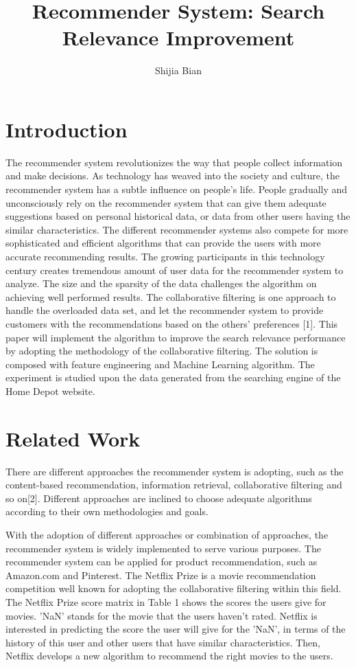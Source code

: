 \documentclass[11pt, titlepage]{article}
\author{Shijia Bian}
\title{Recommender System: Search Relevance Improvement}
\date{\parbox{\linewidth}{}}
\begin{document}
\maketitle
\setcounter{tocdepth}{1}
\section{Introduction}


The recommender system revolutionizes the way that people collect information and make decisions. As technology has weaved into the society and culture, the recommender system has a subtle influence on people's life. People gradually and unconsciously rely on the recommender system that can give them adequate suggestions based on personal historical data, or data from other users having the similar characteristics. The different recommender systems also compete for more sophisticated and efficient algorithms that can provide the users with more accurate recommending results. The growing participants in this technology century creates tremendous amount of user data for the recommender system to analyze. The size and the sparsity of the data challenges the algorithm on achieving well performed results. The collaborative filtering is one approach to handle the overloaded data set, and let the recommender system to provide customers with the recommendations based on the others' preferences [1]. This paper will implement the algorithm to improve the search relevance performance by adopting the methodology of the collaborative filtering. The solution is composed with feature engineering and Machine Learning algorithm. The experiment is studied upon the data generated from the searching engine of the Home Depot website.

\section{Related Work}



There are different approaches the recommender system is adopting, such as the content-based recommendation, information retrieval, collaborative filtering and so on[2]. Different approaches are inclined to choose adequate algorithms according to their own methodologies and goals. 

\vspace{3mm} 
With the adoption of different approaches or combination of approaches, the recommender system is widely implemented to serve various purposes. The recommender system can be applied for product recommendation, such as Amazon.com and Pinterest. The Netflix Prize is a movie recommendation competition well known for adopting the collaborative filtering within this field. The Netflix Prize score matrix in Table 1 shows the scores the users give for movies. 'NaN' stands for the movie that the users haven't rated. Netflix is interested in predicting the score the user will give for the 'NaN', in terms of the history of this user and other users that have similar characteristics. Then, Netflix develops a new algorithm to recommend the right movies to the users. 
\end{document}
